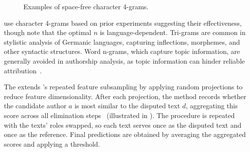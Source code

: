 \begin{figure}[ht]
    \centering
    \caption[Examples of space-free character 4-grams]{Examples of space-free character 4-grams.}
    \label{fig:spacefree_4gram}
\end{figure}

\citet{koppel_determining_2014} use character 4-grams based on prior experiments suggesting their effectiveness, though \citet{neal_surveying_2018} note that the optimal $n$ is language-dependent. 
Tri-grams are common in stylistic analysis of Germanic languages, capturing inflections, %
morphemes, %
and other syntactic structures. 
Word n-grams, which capture topic information, are generally avoided in authorship analysis, as topic information can hinder reliable attribution~\citep{neal_surveying_2018,Sapkota_ngrams_2015}.

The \impAppr{} extends \unmasking{}'s repeated feature subsampling \citep{koppel_authorship_2004} by applying random projections to reduce feature dimensionality.
After each projection, the method records whether the candidate author $a$ is most similar to the disputed text $d$, aggregating this score across all elimination steps~\citep{tyo_state_2022} (illustrated in ). 
The procedure is repeated with the texts' roles swapped, so each text serves once as the disputed text and once as the reference. 
Final predictions are obtained by averaging the aggregated scores and applying a threshold.

